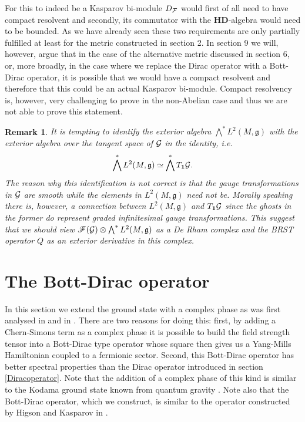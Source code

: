 \documentclass[letterpaper,12pt]{article}
\def\cf{{\cal F}}
\def\cg{{\cal G}}
\newtheorem{remark}{Remark}
\begin{document}
For this to indeed be a Kasparov bi-module  $D_\cf$ would first of all need to have compact resolvent and secondly, its commutator with the $\mathbf{HD}$-algebra would need to be bounded. As we have already seen these two requirements are only partially fulfilled at least for the metric constructed in section 2. In section 9 we will, however, argue that in the case of the alternative metric discussed in section 6, or, more broadly, in the case where we replace the Dirac operator with a Bott-Dirac operator, it is possible that we would have a compact resolvent and therefore that this could be an actual Kasparov bi-module. Compact resolvency is, however, very challenging to prove in the non-Abelian case and thus we are not able to prove this statement.









\begin{remark}
It is tempting to identify the exterior algebra $\bigwedge^* L^2(M,\mathfrak{g})$ with the exterior algebra over the tangent space of $\cg$ in the identity, i.e.
$$
\bigwedge^* L^2(M,\mathfrak{g}) \simeq \bigwedge^* T_\mathbf{1}\cg.
$$
The reason why this identification is not correct is that the gauge transformations in $\cg$ are smooth while the elements in $L^2(M,\mathfrak{g})$ need not be. Morally speaking there is, however, a connection between $L^2(M,\mathfrak{g})$ and $T_\mathbf{1}\cg$ since the ghosts in the former do represent graded infinitesimal gauge transformations. 
This suggest that we should view $\mathscr{F} (\cg)\otimes \bigwedge^* L^2(M,\mathfrak{g})$ as a De Rham complex and the BRST operator $Q$ as an exterior derivative in this complex.
\end{remark}



\section{The Bott-Dirac operator}

In this section we extend the ground state with a complex phase as was first analysed in \cite{Aastrup:2019yui} and in \cite{Aastrup:2020jcf}. There are two reasons for doing this: first, by adding a Chern-Simons term as a complex phase it is possible to build the field strength tensor into a Bott-Dirac type operator whose square then gives us a Yang-Mills Hamiltonian coupled to a fermionic sector. Second, this Bott-Dirac operator has better spectral properties than the Dirac operator introduced in section \ref{Diracoperator}. Note that the addition of a complex phase of this kind is similar to the Kodama ground state known from quantum gravity \cite{Kodama:1988yf,Smolin:2002sz}. Note also that the Bott-Dirac operator, which we construct, is similar to the operator constructed by Higson and Kasparov in \cite{Higson}. \\
\end{document}
